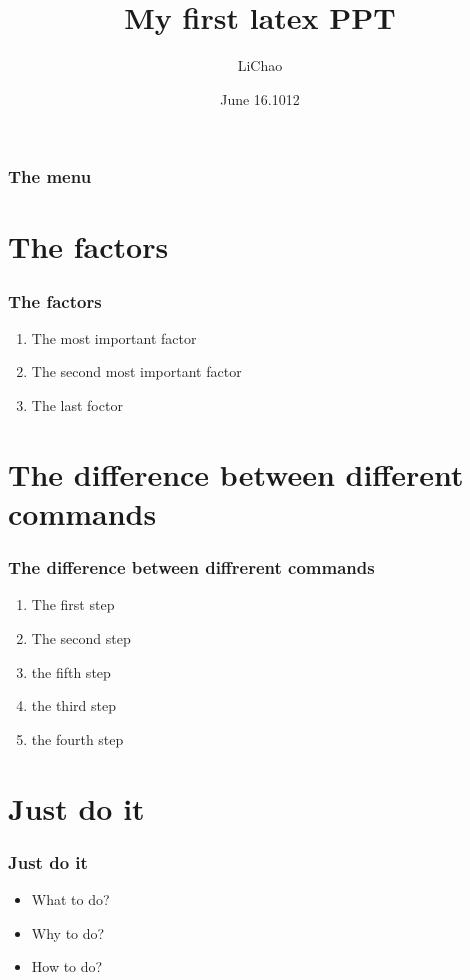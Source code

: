 \documentclass{beamer}
\begin{document}
\title{My first latex PPT}
\author{LiChao}
\date{June 16.1012}

\begin{frame}
  \titlepage
\end{frame}

\begin{frame}
  \frametitle{The menu}
  \tableofcontents
\end{frame}

\section{The factors}
\begin{frame}
\frametitle{The factors}
  \begin{enumerate}
     \item The most important factor \pause
     \item The second most important factor \pause
     \item The last foctor
  \end{enumerate}
\end{frame}

\section{The difference between different commands}
\begin{frame}
\frametitle{The difference between diffrerent commands}
  \begin{enumerate}
     \item <1-> The first step
     \item <2-> The second step
     \item <5-> the fifth step
     \item <3-> the third step
     \item <4-> the fourth step
  \end{enumerate}
\end{frame}
  

\section{Just do it}

\begin{frame}
\frametitle{Just do it}
   \begin{itemize}
      \item What to do?           \pause
      \item Why to do?            \pause
      \item How to do?
   \end{itemize}
\end{frame}
\end{document}
